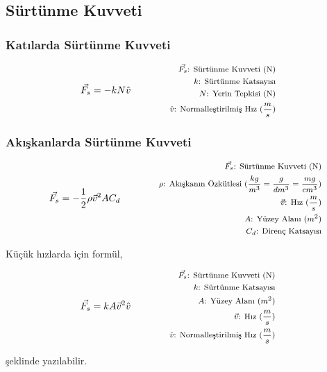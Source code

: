 \subsection{Sürtünme Kuvveti}

\subsubsection*{Katılarda Sürtünme Kuvveti}

\begin{equation}
    \vec{F_s} = -kN\hat{v} \qquad \qquad \parbox{4cm}{\footnotesize$\begin{aligned}
        \vec{F_s}\text{: Sürtünme Kuvveti (N)} \\
        k\text{: Sürtünme Katsayısı} \\
        N\text{: Yerin Tepkisi (N)} \\
        \hat{v}\text{: Normalleştirilmiş Hız } (\frac{m}{s})
\end{aligned}$}
\end{equation}

\subsubsection*{Akışkanlarda Sürtünme Kuvveti}
\begin{equation}
    \vec{F_s} = -\frac{1}{2}\rho \vec{v}^2 A C_d \qquad \qquad \parbox{5.5cm}{\footnotesize$\begin{aligned}
        \vec{F_s}\text{: Sürtünme Kuvveti (N)} \\
        \rho\text{: Akışkanın Özkütlesi } (\frac{kg}{m^3} = \frac{g}{dm^3} = \frac{mg}{cm^3})  \\
        \vec{v}\text{: Hız } (\frac{m}{s}) \\
        A\text{: Yüzey Alanı } (m^2) \\
        C_d\text{: Direnç Katsayısı} \\
\end{aligned}$}
\end{equation}

Küçük hızlarda için formül,

\begin{equation}
    \vec{F_s} = k A \vec{v}^2 \hat{v} \qquad \qquad \parbox{4cm}{\footnotesize$\begin{aligned}
        \vec{F_s}\text{: Sürtünme Kuvveti (N)} \\
        k\text{: Sürtünme Katsayısı} \\
        A\text{: Yüzey Alanı } (m^2) \\
        \vec{v}\text{: Hız } (\frac{m}{s}) \\
        \hat{v}\text{: Normalleştirilmiş Hız } (\frac{m}{s})
\end{aligned}$}
\end{equation}

şeklinde yazılabilir.
